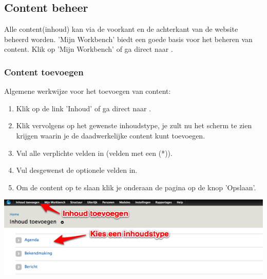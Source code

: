 \subsection{Content beheer}\label{contentbeheer}
Alle content(inhoud) kan via de voorkant en de achterkant van de website beheerd worden. 
'Mijn Workbench' biedt een goede basis voor het beheren van content. Klik op 'Mijn Workbench' of ga direct naar . 

\subsubsection{Content toevoegen}\label{contenttoevoegen}
Algemene werkwijze voor het toevoegen van content:
\begin{enumerate}
\item Klik op de link 'Inhoud' of ga direct naar .
\item Klik vervolgens op het gewenste inhoudstype, je zult nu het scherm te zien krijgen waarin je de daadwerkelijke content kunt toevoegen.
\item Vul alle verplichte velden in (velden met een (*)).
\item Vul desgewenst de optionele velden in.
\item Om de content op te slaan klik je onderaan de pagina op de knop 'Opslaan'.
\end{enumerate}

\bigskip

\begin{center}
	\includegraphics[width=\textwidth]{img/content1.png}
\end{center}


